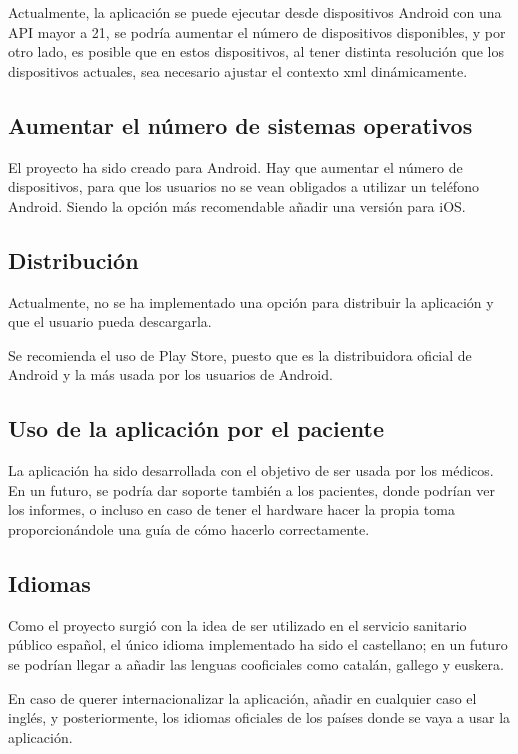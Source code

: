 Actualmente, la aplicación se puede ejecutar desde dispositivos Android con una API mayor a 21, se podría aumentar el número de dispositivos disponibles, y por otro lado, es posible que en estos dispositivos, al tener distinta resolución que los dispositivos actuales, sea necesario ajustar el contexto xml dinámicamente.

\subsection{Aumentar el número de sistemas operativos}

El proyecto ha sido creado para Android. Hay que aumentar el número de dispositivos, para que los usuarios no se vean obligados a utilizar un teléfono Android. Siendo la opción más recomendable añadir una versión para iOS.

\subsection{Distribución}

Actualmente, no se ha implementado una opción para distribuir la aplicación y que el usuario pueda descargarla.

Se recomienda el uso de Play Store, puesto que es la distribuidora oficial de Android y la más usada por los usuarios de Android.

\subsection{Uso de la aplicación por el paciente}

La aplicación ha sido desarrollada con el objetivo de ser usada por los médicos. En un futuro, se podría dar soporte también a los pacientes, donde podrían ver los informes, o incluso en caso de tener el hardware hacer la propia toma proporcionándole una guía de cómo hacerlo correctamente.

\subsection{Idiomas}

Como el proyecto surgió con la idea de ser utilizado en el servicio sanitario público español, el único idioma implementado ha sido el castellano; en un futuro se podrían llegar a añadir las lenguas cooficiales como catalán, gallego y euskera.

En caso de querer internacionalizar la aplicación, añadir en cualquier caso el inglés, y posteriormente, los idiomas oficiales de los países donde se vaya a usar la aplicación.

